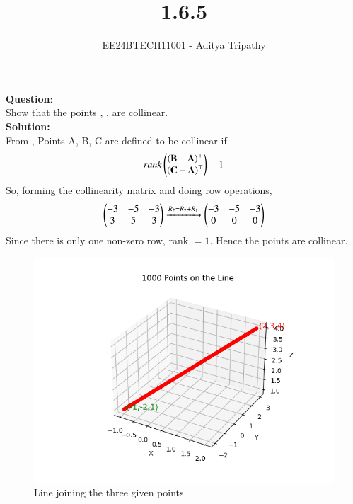 \documentclass[journal]{IEEEtran}
\begin{document}

\vspace{3cm}

\title{1.6.5}
\author{EE24BTECH11001 - Aditya Tripathy
}
 \maketitle
{\let\newpage\relax\maketitle}

\renewcommand{\thefigure}{\theenumi}
\renewcommand{\thetable}{\theenumi}
\setlength{\intextsep}{10pt} %


\renewcommand{\thetable}{\theenumi}


\textbf{Question}:\\
Show that the points ,  , are collinear.
\\
\textbf{Solution: }\\
From , Points A, B, C are defined to be collinear if
\begin{align} 
	rank\begin{pmatrix}\left(\mathbf{B}-\mathbf{A}\right)^\top \\ \left(\mathbf{C}-\mathbf{A}\right)^\top \end{pmatrix} = 1\\
\end{align}
So, forming the collinearity matrix and doing row operations,
\begin{align}
	\begin{pmatrix}-3&-5&-3\\3&5&3\end{pmatrix} \xrightarrow{R_2 = R_2+R_1}  \begin{pmatrix}-3&-5&-3\\0&0&0\end{pmatrix}\\
\end{align}
Since there is only one non-zero row, rank $= 1$. Hence the points are collinear.
\begin{figure}[h!]
   \centering
   \includegraphics[width=0.7\linewidth]{figs/fig.png}
   \caption{Line joining the three given points}
\end{figure}
\end{document}
